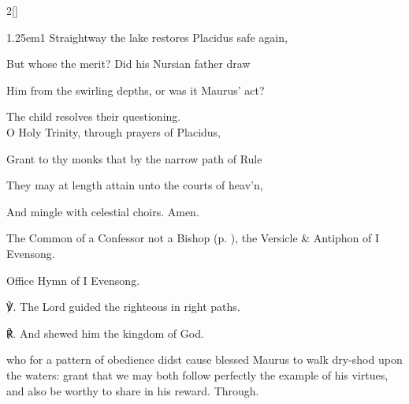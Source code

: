\begin{paracol}{2}[]
\begin{hangparas}{1.25em}{1}
Straightway the lake restores Placidus safe again,

But whose the merit? Did his Nursian father draw

Him from the swirling depths, or was it Maurus' act?

The child resolves their questioning.\\

O Holy Trinity, through prayers of Placidus,

Grant to thy monks that by the narrow path of Rule

They may at length attain unto the courts of heav'n,

And mingle with celestial choirs. Amen.\\
\end{hangparas}

\mattinsOfficeHymn

\begin{rubric}
	The Common of a Confessor not a Bishop (p. \pageref{CommonConfessorNotBishop}), the Versicle \& Antiphon of I Evensong.
\end{rubric}

\secondEvensong


\secondEvensongHymn

\begin{rubric}
	Office Hymn of I Evensong.
\end{rubric}

℣. The Lord guided the righteous in right paths.

℟. And shewed him the kingdom of God.


\fussy
\end{paracol}

\collect
{} who for a pattern of obedience didst cause blessed Maurus to walk dry-shod upon the waters: grant that we may both follow perfectly the example of his virtues, and also be worthy to share in his reward. Through.



